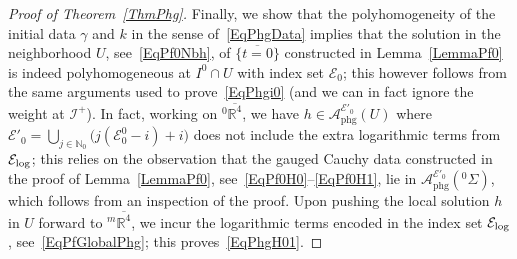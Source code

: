 \documentclass[reqno,11pt,letterpaper]{amsart}
\numberwithin{equation}{section}
\numberwithin{figure}{section}
\theoremstyle{definition}
\theoremstyle{remark}
\newcommand{\mc}{\mathcal}
\newcommand{\cA}{\mc A}
\newcommand{\cE}{\mc E}
\newcommand{\ms}{\mathscr}
\newcommand{\scri}{\ms I}
\newcommand{\N}{\mathbb{N}}
\newcommand{\R}{\mathbb{R}}
\newcommand{\ol}{\overline}
\newcommand{\phg}{{\mathrm{phg}}}
\newcommand{\usref}[1]{{\upshape\ref{#1}}}
\begin{document}
\begin{proof}[Proof of Theorem~\usref{ThmPhg}]
  Finally, we show that the polyhomogeneity of the initial data $\gamma$ and $k$ in the sense of~\eqref{EqPhgData} implies that the solution in the neighborhood $U$, see~\eqref{EqPf0Nbh}, of $\ol{\{t=0\}}$ constructed in Lemma~\ref{LemmaPf0} is indeed polyhomogeneous at $I^0\cap U$ with index set $\cE_0$; this however follows from the same arguments used to prove~\eqref{EqPhgi0} (and we can in fact ignore the weight at $\scri^+$). In fact, working on ${}^0\ol{\R^4}$, we have $h\in\cA_\phg^{\cE'_0}(U)$ where $\cE'_0=\bigcup_{j\in\N_0}\bigr(j(\cE_0^0-i)+i\bigr)$ does not include the extra logarithmic terms from $\cE_{\rm log}$; this relies on the observation that the gauged Cauchy data constructed in the proof of Lemma~\ref{LemmaPf0}, see~\eqref{EqPf0H0}--\eqref{EqPf0H1}, lie in $\cA_\phg^{\cE'_0}({}^0\Sigma)$, which follows from an inspection of the proof. Upon pushing the local solution $h$ in $U$ forward to ${}^m\ol{\R^4}$, we incur the logarithmic terms encoded in the index set $\cE_{\rm log}$, see~\eqref{EqPfGlobalPhg}; this proves~\eqref{EqPhgH01}.
\end{proof}
\end{document}
